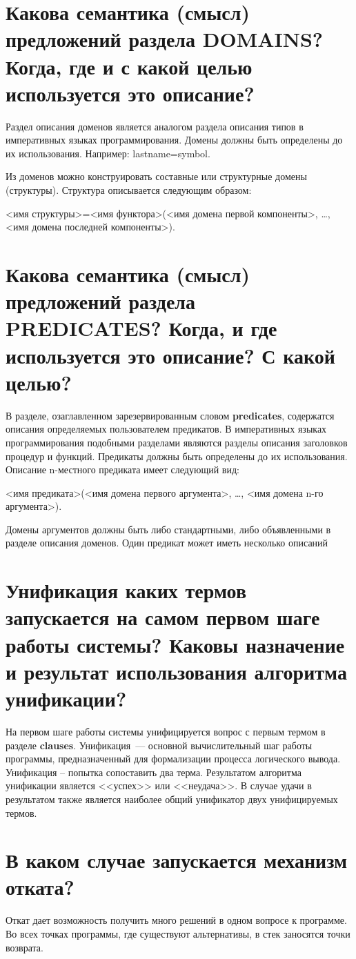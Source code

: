 \section{Какова семантика (смысл) предложений раздела DOMAINS\@? Когда, где и с какой целью используется это описание?}
Раздел описания доменов является аналогом раздела описания типов в императивных языках программирования. Домены должны быть определены до их использования. Например: lastname=symbol.

Из доменов можно конструировать составные или структурные домены (структуры). Структура описывается следующим образом:

<имя структуры>=<имя функтора>(<имя домена первой компоненты>, \ldots, <имя домена последней компоненты>).

\sloppy\section{Какова семантика (смысл) предложений раздела PREDICATES\@? Когда, и где используется это описание? С какой целью?}
В разделе, озаглавленном зарезервированным словом \textbf{predicates}, содержатся описания определяемых пользователем предикатов. В императивных языках программирования подобными разделами являются разделы описания заголовков процедур и функций. Предикаты должны быть определены до их использования. Описание n-местного предиката имеет следующий вид:

<имя предиката>(<имя домена первого аргумента>, \ldots{}, <имя домена n-го аргумента>).

Домены аргументов должны быть либо стандартными, либо объявленными в разделе описания доменов. Один предикат может иметь несколько описаний

\section{Унификация каких термов запускается на самом первом шаге работы системы? Каковы назначение и результат использования алгоритма унификации?}
На первом шаге работы системы унифицируется вопрос с первым термом в разделе \textbf{clauses}. Унификация~--- основной вычислительный шаг работы программы, предназначенный для формализации процесса логического вывода. Унификация – попытка сопоставить два терма. Результатом алгоритма унификации является <<успех>> или <<неудача>>. В случае удачи в результатом также является наиболее общий унификатор двух унифицируемых термов.

\section{В каком случае запускается механизм отката?}
Откат дает возможность получить много решений в одном вопросе к программе. Во всех точках программы, где существуют альтернативы, в стек заносятся точки возврата.


